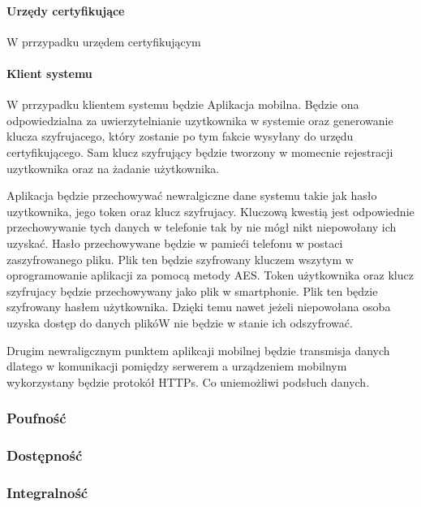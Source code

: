 		\paragraph*{Urzędy certyfikujące}
		W prrzypadku \NazwaSys urzędem certyfikującym 
		\paragraph{Klient systemu}
		W prrzypadku \NazwaSys klientem systemu będzie Aplikacja mobilna. Będzie ona odpowiedzialna za uwierzytelnianie uzytkownika w systemie oraz generowanie klucza szyfrujacego, który zostanie po tym fakcie wysyłany do urzędu certyfikującego. Sam klucz szyfrujący będzie tworzony w momecnie rejestracji uzytkownika oraz na żadanie użytkownika.
		 
		Aplikacja będzie przechowywać newralgiczne dane systemu takie jak hasło uzytkownika, jego token oraz klucz szyfrujacy. Kluczową kwestią jest odpowiednie przechowywanie tych danych w telefonie tak by nie mógł nikt niepowołany ich uzyskać. Hasło przechowywane będzie w pamieći telefonu w postaci zaszyfrowanego pliku. Plik ten będzie szyfrowany kluczem wszytym w oprogramowanie aplikacji za pomocą metody AES. Token użytkownika oraz klucz szyfrujacy będzie przechowywany jako plik w smartphonie. Plik ten będzie szyfrowany hasłem użytkownika. Dzięki temu nawet jeżeli niepowołana osoba uzyska dostęp do danych plikóW nie będzie w stanie ich odszyfrować.
		
		Drugim newraligcznym punktem aplikcaji mobilnej będzie transmisja danych dlatego w komunikacji pomiędzy serwerem a urządzeniem mobilnym wykorzystany będzie protokół HTTPs. Co uniemożliwi podsłuch danych.
	\subsubsection{Poufność}
	\subsubsection{Dostępność}
	\subsubsection{Integralność}
